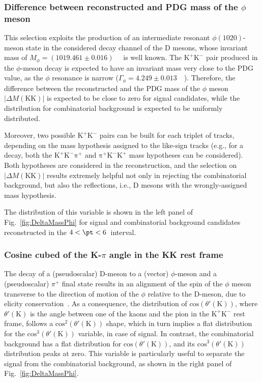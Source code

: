 \subsubsection{Difference between reconstructed and PDG mass of the \boldmath$\phi$ meson}
\begin{sloppypar}
This selection exploits the production of an intermediate resonant $\phi(1020)$-meson state in the considered decay channel of the D mesons, whose invariant mass of \mbox{$M_\phi = (1019.461\pm0.016)$}~\mevcc~\cite{pdg} is well known. The $\mathrm{K^+K^-}$ pair produced in the $\phi$-meson decay is expected to have an invariant mass very close to the PDG value, as the $\phi$ resonance is narrow ($\Gamma_\phi = 4.249\pm0.013$~\mevcc~\cite{pdg}). Therefore, the difference between the reconstructed and the PDG mass of the $\phi$ meson $\lvert\Delta M(\mathrm{KK})\rvert$ is expected to be close to zero for signal candidates, while the distribution for combinatorial background is expected to be uniformly distributed.
\end{sloppypar}
Moreover, two possible $\mathrm{K^+K^-}$ pairs can be built for each triplet of tracks, depending on the mass hypothesis assigned to the like-sign tracks (e.g., for a \ds decay, both the $\mathrm{K^+K^-\pi^+}$ and $\mathrm{\pi^+K^-K^+}$ mass hypotheses can be considered). Both hypotheses are considered in the reconstruction, and the selection on $\lvert\Delta M(\mathrm{KK})\rvert$  results extremely helpful not only in rejecting the combinatorial background, but also the reflections, i.e., D mesons with the wrongly-assigned mass hypothesis.


The distribution of this variable is shown in the left panel of Fig.~\ref{fig:DeltaMassPhi} for signal and combinatorial background candidates reconstructed in the $4 < \pt < 6$~\gevc interval.

\subsubsection{Cosine cubed of the K-\boldmath$\pi$ angle in the KK rest frame}
The decay of a (pseudoscalar) D-meson to a (vector) $\phi$-meson and a (pseudoscalar) $\pi^+$ final state results in an alignment of the spin of the $\phi$ meson transverse to the direction of motion of the $\phi$ relative to the D-meson, due to elicity conservation~\cite{ATLAS:2015igt}. As a consequence, the distribution of $\mathrm{cos}\left(\theta'(\mathrm K)\right)$, where $\theta'(\mathrm K)$ is the angle between one of the kaons and the pion in the $\mathrm{K^+K^-}$
rest frame, follows a $\mathrm{cos}^2\left(\theta'(\mathrm K)\right)$ shape, which in turn implies a flat distribution for the $\mathrm{cos}^3\left(\theta'(\mathrm K)\right)$ variable, in case of signal. In contrast, the combinatorial background has a flat distribution for $\mathrm{cos}\left(\theta'(\mathrm K)\right)$, and its $\mathrm{cos}^3\left(\theta'(\mathrm K)\right)$ distribution peaks at zero. This variable is particularly useful to separate the signal from the combinatorial background, as shown in the right panel of Fig.~\ref{fig:DeltaMassPhi}.

